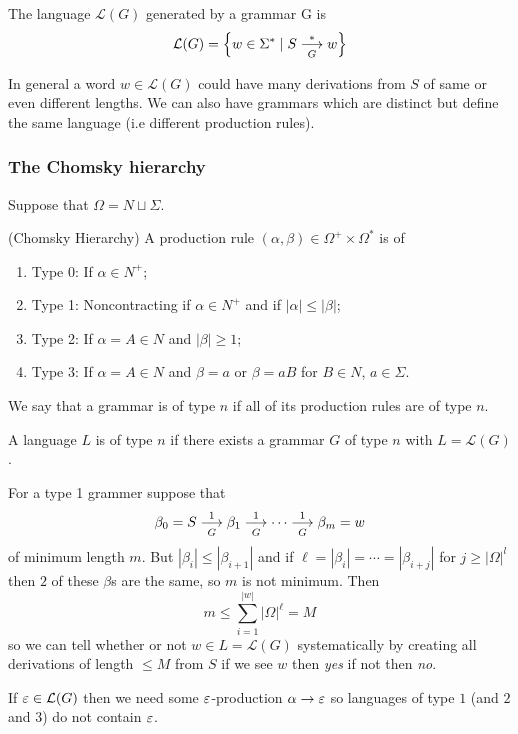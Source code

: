\documentclass[tikx, border = 10pt]{article}
\begin{document}
 \begin{definition}
	 The language $ \mathcal L(G) $ generated by a grammar G is
	 \[
		 \mathcal L(G) = \left\{w\in \Sigma^* \mid S\arr G* w\right\}
	 \]
 \end{definition} 
\begin{remark}
  In general a word $ w\in \mathcal L(G) $ could have many derivations from $ S $ of same or even different lengths. We can also have grammars which are distinct but define the same language (i.e different production rules).
\end{remark}
\subsubsection{The Chomsky hierarchy}
Suppose that $ \Omega = N\sqcup \Sigma $.
\begin{definition}
	(Chomsky Hierarchy) A production rule $ (\alpha,\beta)\in \Omega^+ \times \Omega^* $ is of
	\begin{enumerate}
		\item Type 0: If $ \alpha \in N^+ $;
		\item Type 1: Noncontracting if $ \alpha\in N^+ $ and if $ |\alpha|\le |\beta| $;
		\item Type 2: If $ \alpha = A\in N $ and $ |\beta| \ge 1 $;
		\item Type 3: If $ \alpha = A\in N $ and $ \beta = a $ or $ \beta = aB $ for $ B\in N $, $ a\in \Sigma $.
	\end{enumerate}
	We say that a grammar is of type $ n $ if all of its production rules are of type $ n $. \par
	A language $ L $ is of type $ n $ if there exists a grammar $ G $ of type $ n $ with $ L = \mathcal L(G) $.
\end{definition}
For a type 1 grammer suppose that
\[
  \beta_0 = S \arr G1 \beta_1 \arr G1\cdots \arr G1 \beta_m = w
\]
of minimum length $ m $. But $ |\beta_i|\le |\beta_{i+1}| $ and if $ \ell = |\beta_i| = \cdots = |\beta_{i+j}| $ for $ j \ge |\Omega|^l $ then $ 2 $ of these $ \beta $s are the same, so $ m $ is not minimum. Then
\[
	m\le \sum_{i=1}^{|w|} |\Omega|^\ell = M
\]
so we can tell whether or not $ w\in L=\mathcal L(G) $ systematically by creating all derivations of length $ \le M $ from $ S $ if we see $ w $ then \textit{yes} if not then \textit{no}.
\begin{remark}
  If $ \ep \in \mathcal L(G) $ then we need some $ \ep $-production $ \alpha\to\ep $ so languages of type $ 1 $ (and $ 2 $ and $ 3 $) do not contain $ \ep $.
\end{remark}
\end{document}
